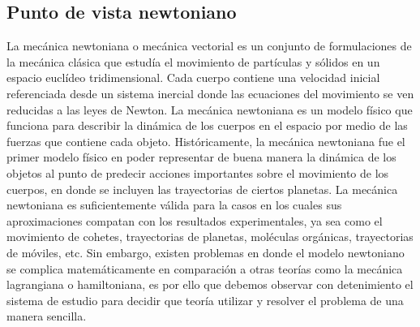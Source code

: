 \subsection{Punto de vista newtoniano}
La mecánica newtoniana o mecánica vectorial es un conjunto de formulaciones de la mecánica clásica que estudía el movimiento de partículas y sólidos en un espacio euclídeo tridimensional. Cada cuerpo contiene una velocidad inicial referenciada desde un sistema inercial donde las ecuaciones del movimiento se ven reducidas a las leyes de Newton. La mecánica newtoniana es un modelo físico que funciona para describir la dinámica de los cuerpos en el espacio por medio de las fuerzas que contiene cada objeto. Históricamente, la mecánica newtoniana fue el primer modelo físico en poder representar de buena manera la dinámica de los objetos al punto de predecir acciones importantes sobre el movimiento de los cuerpos, en donde se incluyen las trayectorias de ciertos planetas. La mecánica newtoniana es suficientemente válida para la casos en los cuales sus aproximaciones compatan con los resultados experimentales, ya sea como el movimiento de cohetes, trayectorias de planetas, moléculas orgánicas, trayectorias de móviles, etc. Sin embargo, existen problemas en donde el modelo newtoniano se complica matemáticamente en comparación a otras teorías como la mecánica lagrangiana o hamiltoniana, es por ello
que debemos observar con detenimiento el sistema de estudio para decidir que teoría utilizar y resolver el problema de una manera sencilla.
